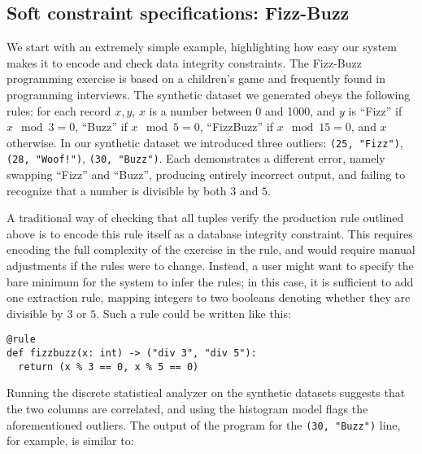 \subsection{Soft constraint specifications: Fizz-Buzz}


We start with an extremely simple example, highlighting how easy our system makes it to encode and check data integrity constraints. The Fizz-Buzz programming exercise is based on a children's game and frequently found in programming interviews. The synthetic dataset we generated obeys the following rules: for each record \(x, y\), $x$ is a number between 0 and 1000, and $y$ is ``Fizz'' if \(x \mod 3 = 0\), ``Buzz'' if \(x \mod 5 = 0\), ``FizzBuzz'' if \(x \mod 15 = 0\), and \(x\) otherwise. In our synthetic dataset we introduced three outliers: \texttt{(25, "Fizz")}, \texttt{(28, "Woof!")}, \texttt{(30, "Buzz")}. Each demonstrates a different error, namely swapping ``Fizz'' and ``Buzz'', producing entirely incorrect output, and failing to recognize that a number is divisible by both $3$ and $5$.

A traditional way of checking that all tuples verify the production rule outlined above is to encode this rule itself as a database integrity constraint. This requires encoding the full complexity of the exercise in the rule, and would require manual adjustments if the rules were to change. Instead, a user might want to specify the bare minimum for the system to infer the rules; in this case, it is sufficient to add one extraction rule, mapping integers to two booleans denoting whether they are divisible by $3$ or $5$. Such a rule could be written like this:



\begin{verbatim}
@rule
def fizzbuzz(x: int) -> ("div 3", "div 5"):
  return (x % 3 == 0, x % 5 == 0)
\end{verbatim}

Running the discrete statistical analyzer on the synthetic datasets suggests that the two columns are correlated, and using the histogram model flags the aforementioned outliers. The output of the program for the \texttt{(30, "Buzz")} line, for example, is similar to:


